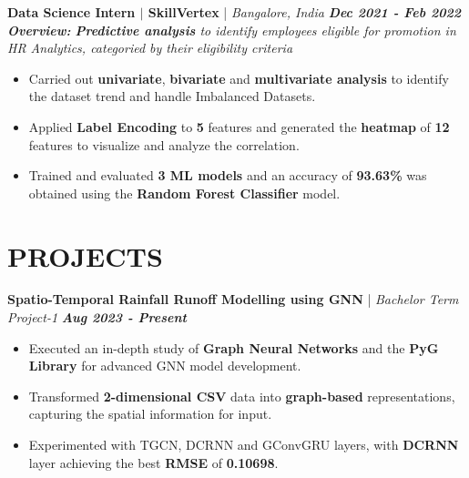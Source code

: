 \documentclass[a4paper,9pt]{extarticle}
\begin{document}
\vspace{-0.1cm}
\noindent
\textbf{Data Science Intern $|$ SkillVertex} | \textit{Bangalore, India} \hfill \textbf{\textit{Dec 2021 - Feb 2022}} \\ %
\textit{\textbf{Overview:} \textbf{Predictive analysis} to identify employees eligible for promotion in HR Analytics, categoried by their eligibility criteria}  %
\vspace{-0.15cm}
\begin{itemize} %
    \item Carried out \textbf{univariate}, \textbf{bivariate} and \textbf{multivariate analysis} to identify the dataset trend and handle Imbalanced Datasets.
    \item Applied \textbf{Label Encoding} to \textbf{5} features and generated the \textbf{heatmap} of \textbf{12} features to visualize and analyze the correlation.
    \item Trained and evaluated \textbf{3 ML models} and an accuracy of \textbf{93.63\%} was obtained using the \textbf{Random Forest Classifier} model.
\end{itemize}

\vspace{-0.3cm}
\section*{PROJECTS}
\vspace{-0.15cm}
\noindent
\textbf{Spatio-Temporal Rainfall Runoff Modelling using GNN} | \textit{Bachelor Term Project-1} \hfill \textbf{\textit{Aug 2023 - Present}} %
\vspace{-0.1cm}
\begin{itemize}
    \item Executed an in-depth study of \textbf{Graph Neural Networks} and the \textbf{PyG Library} for advanced GNN model development.
    \item Transformed \textbf{2-dimensional CSV} data into \textbf{graph-based} representations, capturing the spatial information for input.
    \item Experimented with TGCN, DCRNN and GConvGRU layers, with \textbf{DCRNN} layer achieving the best \textbf{RMSE} of \textbf{0.10698}.
\end{itemize}
\end{document}
